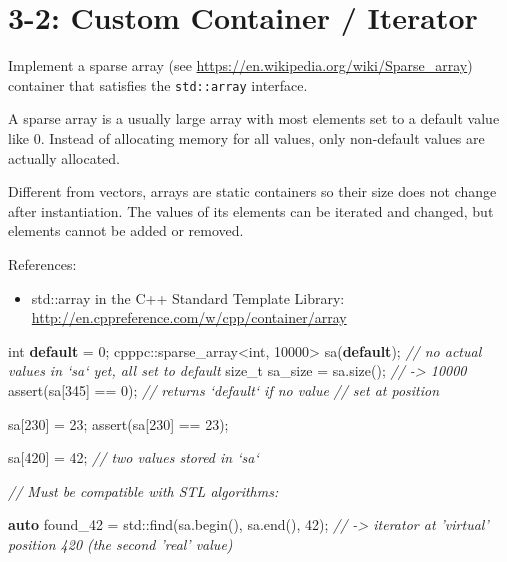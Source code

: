 \documentclass[]{article}
\newenvironment{Shaded}{}{}
\newcommand{\KeywordTok}[1]{\textcolor[rgb]{0.00,0.44,0.13}{\textbf{{#1}}}}
\newcommand{\DataTypeTok}[1]{\textcolor[rgb]{0.56,0.13,0.00}{{#1}}}
\newcommand{\DecValTok}[1]{\textcolor[rgb]{0.25,0.63,0.44}{{#1}}}
\newcommand{\CommentTok}[1]{\textcolor[rgb]{0.38,0.63,0.69}{\textit{{#1}}}}
\newcommand{\ControlFlowTok}[1]{\textcolor[rgb]{0.00,0.44,0.13}{\textbf{{#1}}}}
\newcommand{\BuiltInTok}[1]{{#1}}
\newcommand{\NormalTok}[1]{{#1}}
\providecommand{\tightlist}{%
  \setlength{\itemsep}{0pt}\setlength{\parskip}{0pt}}
\begin{document}
\section{3-2: Custom Container /
Iterator}\label{custom-container-iterator}

Implement a sparse array (see
\url{https://en.wikipedia.org/wiki/Sparse_array}) container that
satisfies the \texttt{std::array} interface.

A sparse array is a usually large array with most elements set to a
default value like 0. Instead of allocating memory for all values, only
non-default values are actually allocated.

Different from vectors, arrays are static containers so their size does
not change after instantiation. The values of its elements can be
iterated and changed, but elements cannot be added or removed.

References:

\begin{itemize}
\tightlist
\item
  std::array in the C++ Standard Template Library:
  \url{http://en.cppreference.com/w/cpp/container/array}
\end{itemize}

\begin{Shaded}
\begin{Highlighting}[]
\DataTypeTok{int} \ControlFlowTok{default} \NormalTok{= }\DecValTok{0}\NormalTok{;}
\NormalTok{cpppc::sparse_array<}\DataTypeTok{int}\NormalTok{, }\DecValTok{10000}\NormalTok{> sa(}\ControlFlowTok{default}\NormalTok{);}
\CommentTok{// no actual values in `sa` yet, all set to default}
\DataTypeTok{size_t} \NormalTok{sa_size = sa.size(); }\CommentTok{// -> 10000}
\NormalTok{assert(sa[}\DecValTok{345}\NormalTok{] == }\DecValTok{0}\NormalTok{);       }\CommentTok{// returns `default` if no value}
                            \CommentTok{// set at position}

\NormalTok{sa[}\DecValTok{230}\NormalTok{] = }\DecValTok{23}\NormalTok{;}
\NormalTok{assert(sa[}\DecValTok{230}\NormalTok{] == }\DecValTok{23}\NormalTok{);}

\NormalTok{sa[}\DecValTok{420}\NormalTok{] = }\DecValTok{42}\NormalTok{;}
\CommentTok{// two values stored in `sa`}

\CommentTok{// Must be compatible with STL algorithms:}

\KeywordTok{auto} \NormalTok{found_42 = }\BuiltInTok{std::}\NormalTok{find(sa.begin(), sa.end(), }\DecValTok{42}\NormalTok{);}
\CommentTok{// -> iterator at 'virtual' position 420 (the second 'real' value)}
\end{Highlighting}
\end{Shaded}
\end{document}
